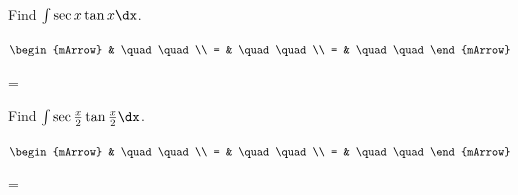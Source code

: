 \begin{mtask} 
   \task \begin{exercise} Find $\int \sec x \tan x \dx$.
           \begin{envSolution}
             $\begin{mArrow}
                   & \quad \quad              \\
		   		 = & \quad \quad              \\
				 = & \quad \quad 
              \end{mArrow}$
            \begin{shortsolution}  
			     =$ \quad \quad \quad \quad$
			\end{shortsolution}				 
           \end{envSolution}
         \end{exercise}

   \task \begin{exercise} Find $\int \sec {\frac{x}{2}} \tan {\frac{x}{2}} \dx$.
           \begin{envSolution}
             $\begin{mArrow}
                   & \quad \quad              \\
		   		 = & \quad \quad              \\
				 = & \quad \quad 
              \end{mArrow}$
            \begin{shortsolution}  
			     =$ \quad \quad \quad \quad$
			\end{shortsolution}				 
           \end{envSolution}
         \end{exercise}
\end{mtask}


